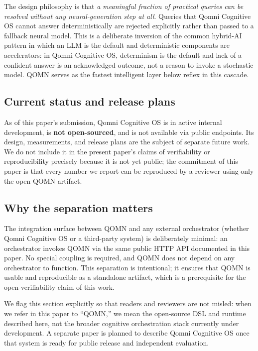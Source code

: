 \documentclass[11pt,a4paper]{article}
\begin{document}
The design philosophy is that \emph{a meaningful fraction of practical queries can be resolved without any neural-generation step at all}. Queries that Qomni Cognitive OS cannot answer deterministically are rejected explicitly rather than passed to a fallback neural model. This is a deliberate inversion of the common hybrid-AI pattern in which an LLM is the default and deterministic components are accelerators: in Qomni Cognitive OS, determinism is the default and lack of a confident answer is an acknowledged outcome, not a reason to invoke a stochastic model. QOMN serves as the fastest intelligent layer below reflex in this cascade.

\subsection{Current status and release plans}

As of this paper's submission, Qomni Cognitive OS is in active internal development, is \textbf{not open-sourced}, and is not available via public endpoints. Its design, measurements, and release plans are the subject of separate future work. We do not include it in the present paper's claims of verifiability or reproducibility precisely because it is not yet public; the commitment of this paper is that every number we report can be reproduced by a reviewer using only the open QOMN artifact.

\subsection{Why the separation matters}

The integration surface between QOMN and any external orchestrator (whether Qomni Cognitive OS or a third-party system) is deliberately minimal: an orchestrator invokes QOMN via the same public HTTP API documented in this paper. No special coupling is required, and QOMN does not depend on any orchestrator to function. This separation is intentional; it ensures that QOMN is usable and reproducible as a standalone artifact, which is a prerequisite for the open-verifiability claim of this work.

We flag this section explicitly so that readers and reviewers are not misled: when we refer in this paper to ``QOMN,'' we mean the open-source DSL and runtime described here, not the broader cognitive orchestration stack currently under development. A separate paper is planned to describe Qomni Cognitive OS once that system is ready for public release and independent evaluation.
\end{document}
